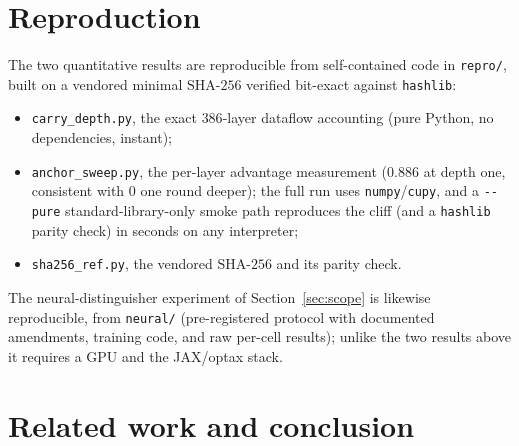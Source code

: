 \documentclass[11pt]{article}
\theoremstyle{remark}
\newcommand{\SHA}{\mathrm{SHA\text{-}256}}
\begin{document}
\section{Reproduction}\label{sec:repro}

The two quantitative results are reproducible from self-contained code in
\texttt{repro/}, built on a vendored minimal $\SHA$ verified bit-exact
against \texttt{hashlib}:
\begin{itemize}
\item \texttt{carry\_depth.py}, the exact $386$-layer dataflow
  accounting (pure Python, no dependencies, instant);
\item \texttt{anchor\_sweep.py}, the per-layer advantage measurement
  ($0.886$ at depth one, consistent with $0$ one round deeper); the full
  run uses \texttt{numpy}/\texttt{cupy}, and a \texttt{-{}-pure}
  standard-library-only smoke path reproduces the cliff (and a
  \texttt{hashlib} parity check) in seconds on any interpreter;
\item \texttt{sha256\_ref.py}, the vendored $\SHA$ and its parity
  check.
\end{itemize}
The neural-distinguisher experiment of Section~\ref{sec:scope} is
likewise reproducible, from \texttt{neural/}
(pre-registered protocol with documented amendments, training code, and
raw per-cell results); unlike the two results above it requires a GPU
and the JAX/optax stack.

\section{Related work and conclusion}\label{sec:related}
\end{document}
